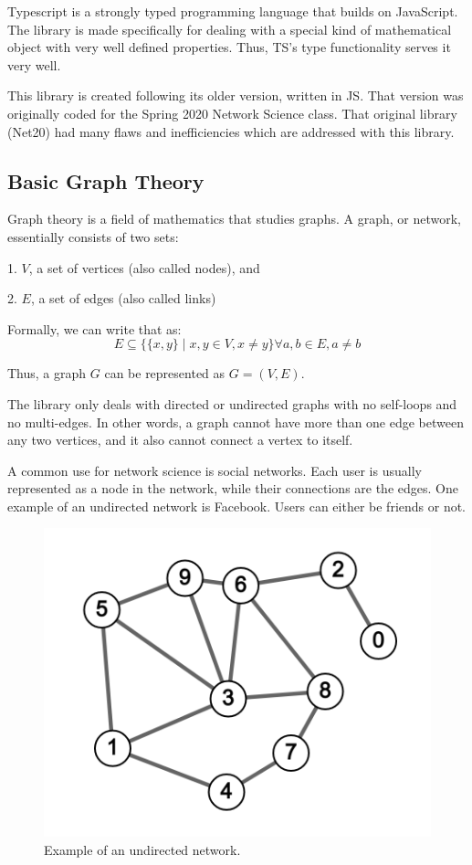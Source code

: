 Typescript is a strongly typed programming language that builds on JavaScript.
The library is made specifically for dealing with a special kind of mathematical object with very well defined properties.
Thus, TS's type functionality serves it very well.

This library is created following its older version, written in JS.
That version was originally coded for the Spring 2020 Network Science class.
That original library (Net20) had many flaws and inefficiencies which are addressed with this library.

\subsection{Basic Graph Theory}

Graph theory is a field of mathematics that studies graphs.
A graph, or network, essentially consists of two sets:

1. $V$, a set of vertices (also called nodes), and

2. $E$, a set of edges (also called links)

Formally, we can write that as:
$$E\subseteq \{\{x,y\}\mid x,y\in V, x\ne y\}\forall a,b \in E, a\ne b$$

Thus, a graph $G$ can be represented as $G=(V,E)$.

The library only deals with directed or undirected graphs with no self-loops and no multi-edges.
In other words, a graph cannot have more than one edge between any two vertices,
and it also cannot connect a vertex to itself.

A common use for network science is social networks.
Each user is usually represented as a node in the network,
while their connections are the edges.
One example of an undirected network is Facebook.
Users can either be friends or not.

\begin{figure}[H]
  \includegraphics[width=\linewidth]{img/undirected_sample.png}
  \caption{Example of an undirected network.}
  \label{fig:net_un}
\end{figure}

